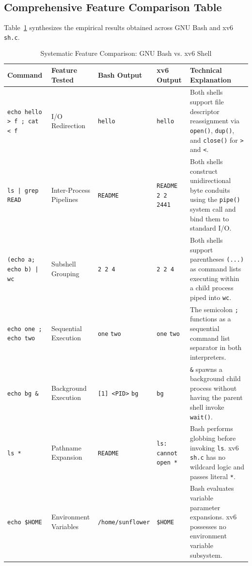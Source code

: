 \documentclass[12pt,a4paper]{article}
\begin{document}
\subsection{Comprehensive Feature Comparison Table}
Table~\ref{tab:bash_vs_xv6} synthesizes the empirical results obtained across GNU Bash and xv6 \texttt{sh.c}.

\begin{table}[H]
\centering
\small
\caption{Systematic Feature Comparison: GNU Bash vs. xv6 Shell}
\label{tab:bash_vs_xv6}
\begin{tabularx}{\textwidth}{p{3.2cm} p{1.8cm} p{2.6cm} p{2.8cm} X}
\toprule
\textbf{Command} & \textbf{Feature Tested} & \textbf{Bash Output} & \textbf{xv6 Output} & \textbf{Technical Explanation} \\
\midrule
\texttt{echo hello > f ; cat < f} & I/O Redirection & \texttt{hello} & \texttt{hello} & Both shells support file descriptor reassignment via \texttt{open()}, \texttt{dup()}, and \texttt{close()} for \texttt{>} and \texttt{<}. \\
\addlinespace
\texttt{ls | grep READ} & Inter-Process Pipelines & \texttt{README} & \texttt{README 2 2 2441} & Both shells construct unidirectional byte conduits using the \texttt{pipe()} system call and bind them to standard I/O. \\
\addlinespace
\texttt{(echo a; echo b) | wc} & Subshell Grouping & \texttt{2 2 4} & \texttt{2 2 4} & Both shells support parentheses \texttt{(...)} as command lists executing within a child process piped into \texttt{wc}. \\
\addlinespace
\texttt{echo one ; echo two} & Sequential Execution & \texttt{one} \newline \texttt{two} & \texttt{one} \newline \texttt{two} & The semicolon \texttt{;} functions as a sequential command list separator in both interpreters. \\
\addlinespace
\texttt{echo bg \&} & Background Execution & \texttt{[1] <PID>} \newline \texttt{bg} & \texttt{bg} & \texttt{\&} spawns a background child process without having the parent shell invoke \texttt{wait()}. \\
\addlinespace
\texttt{ls *} & Pathname Expansion & \texttt{README} & \texttt{ls: cannot open *} & Bash performs globbing before invoking \texttt{ls}. xv6 \texttt{sh.c} has no wildcard logic and passes literal \texttt{*}. \\
\addlinespace
\texttt{echo \$HOME} & Environment Variables & \texttt{/home/sunflower} & \texttt{\$HOME} & Bash evaluates variable parameter expansions. xv6 possesses no environment variable subsystem. \\

\end{tabularx}
\end{table}
\end{document}
